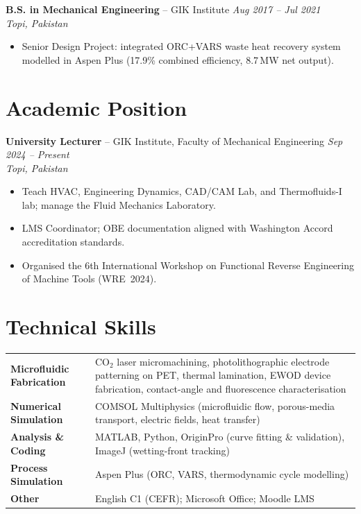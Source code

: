 \documentclass[11pt,a4paper]{article}
\begin{document}
\vspace{4pt}
\textbf{B.S. in Mechanical Engineering} -- GIK Institute
\hfill \textit{Aug 2017 -- Jul 2021}\\
\textit{Topi, Pakistan}
\begin{itemize}
  \item Senior Design Project: integrated ORC+VARS waste heat recovery system
        modelled in Aspen Plus (17.9\% combined efficiency, 8.7\,MW net output).
\end{itemize}

\section{Academic Position}

\textbf{University Lecturer} -- GIK Institute, Faculty of Mechanical Engineering
\hfill \textit{Sep 2024 -- Present}\\
\textit{Topi, Pakistan}
\begin{itemize}
  \item Teach HVAC, Engineering Dynamics, CAD/CAM Lab, and Thermofluids-I lab;
        manage the Fluid Mechanics Laboratory.
  \item LMS Coordinator; OBE documentation aligned with Washington Accord
        accreditation standards.
  \item Organised the 6th International Workshop on Functional Reverse Engineering
        of Machine Tools (WRE~2024).
\end{itemize}

\section{Technical Skills}

\begin{tabularx}{\textwidth}{@{}>{\bfseries}lX@{}}
Microfluidic Fabrication
  & CO$_2$ laser micromachining, photolithographic electrode patterning on PET,
    thermal lamination, EWOD device fabrication, contact-angle and fluorescence
    characterisation \\[3pt]
Numerical Simulation
  & COMSOL Multiphysics (microfluidic flow, porous-media transport, electric
    fields, heat transfer) \\[3pt]
Analysis \& Coding
  & MATLAB, Python, OriginPro (curve fitting \& validation), ImageJ
    (wetting-front tracking) \\[3pt]
Process Simulation
  & Aspen Plus (ORC, VARS, thermodynamic cycle modelling) \\[3pt]
Other
  & English C1 (CEFR); Microsoft Office; Moodle LMS \\
\end{tabularx}
\end{document}
